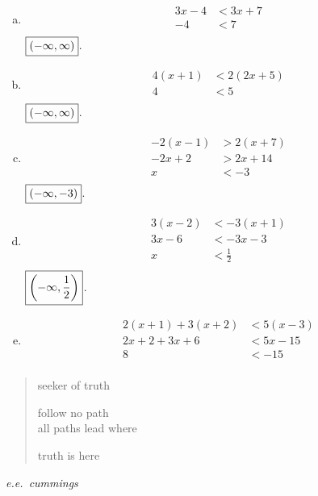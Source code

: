 \documentclass[letterpaper]{exam}
\begin{document}
\begin{description}
\begin{enumerate}[(a)]
          \item
            \begin{align*}
              3x - 4 & < 3x + 7 \\
              -4     & < 7 \\
            \end{align*}
            $\boxed{ \intoo{ -\infty, \infty } }$.

          \item
            \begin{align*}
              4(x + 1) & < 2(2x + 5) \\
              4        & < 5 \\
            \end{align*}
            $\boxed{ \intoo{ -\infty, \infty } }$.

          \item
            \begin{align*}
              -2(x - 1) & > 2(x + 7) \\
              -2x + 2   & > 2x + 14\\
              x         & < -3\\
            \end{align*}
            $\boxed{ \intoo{ -\infty, -3 } }$.

          \item
            \begin{align*}
              3(x - 2) & < -3(x + 1) \\
              3x - 6   & < -3x - 3 \\
              x        & < \frac{1}{2} \\
            \end{align*}
            $\boxed{ \intoo{ -\infty, \frac{1}{2} } }$.

          \item
            \begin{align*}
              2(x + 1) + 3(x + 2) & < 5(x - 3) \\
              2x + 2 + 3x + 6     & < 5x - 15 \\
              8                   & < -15 \\
            \end{align*}

        \end{enumerate}
    \end{description}
  \fi

  \ifprintanswers{}
  \else
    \vspace{12 cm}

    \begin{verse}
      seeker of truth

      follow no path \\
      all paths lead where

      truth is here 
    \end{verse}
    \hspace{2 cm} {\em e.e.\ cummings\/}

    \newpage

  \fi
\end{document}
